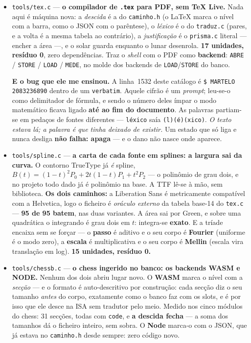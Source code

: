 \documentclass[11pt]{article}
\newcommand{\code}[1]{\texttt{\small #1}}
\theoremstyle{plain}
\theoremstyle{remark}
\begin{document}
\begin{itemize}
\item \code{tools/tex.c} --- \textbf{o compilador de \code{.tex} para PDF, sem TeX Live.} Nada
aqui é máquina nova: a \emph{descida} é a do \code{caminho.h} (o LaTeX marca o nível com a barra,
como o JSON com o parêntese), o \emph{léxico} é o do \code{traduz.c} (pares, e a volta é a mesma
tabela ao contrário), a \emph{justificação} é o \code{prisma.c} literal --- encher a área ---, e o
solar guarda enquanto o lunar desenrola. \textbf{17 unidades, resíduo 0}, zero dependências. Traz
o \emph{shell} com o PDF como \textbf{backend}: \code{ABRE} / \code{STORE} / \code{LOAD} /
\code{MEDE}, no molde dos backends de \code{LOAD}/\code{STORE} do banco.

\textbf{E o bug que ele me ensinou.} A linha~1532 deste catálogo é \code{\$ MARTELO 2083236890}
dentro de um \code{verbatim}. Aquele cifrão é um \emph{prompt}; leu-se-o como delimitador de
fórmula, e sendo o número deles ímpar o modo matemático ficava ligado \textbf{até ao fim do
documento}. As palavras partiam-se em pedaços de fontes diferentes --- \code{léxico} saía
\code{(l)(é)(xico)}. \emph{O texto estava lá; a palavra é que tinha deixado de existir.} Um estado
que só liga e nunca desliga \textbf{não falha: apaga} --- e o dano não nasce onde aparece.

\item \code{tools/spline.c} --- \textbf{a carta de cada fonte em splines: a largura sai da curva.}
O contorno TrueType já \emph{é} spline, $B(t)=(1-t)^2P_0+2t(1-t)P_1+t^2P_2$ --- o polinômio de grau
dois, e no projeto todo dado já é polinômio na base. A TTF lê-se à mão, sem biblioteca. \textbf{Os
dois caminhos:} a Liberation Sans é metricamente compatível com a Helvetica, logo o ficheiro é
\emph{oráculo externo} da tabela base-14 do \code{tex.c} --- \textbf{95 de 95 batem}, nas duas
variantes. A área sai por Green, e sobre uma quadrática o integrando é grau dois em $t$: integra-se
\textbf{exato}. E a tríade encaixa sem se forçar --- o \textbf{passo} é aditivo e o seu corpo é
\textbf{Fourier} (uniforme é o modo zero), a \textbf{escala} é multiplicativa e o seu corpo é
\textbf{Mellin} (escala vira translação em log). \textbf{15 unidades, resíduo 0.}


\item \code{tools/chessb.c} --- \textbf{o chess ingerido no banco: os backends WASM e NODE.}
Nenhum dos dois abriu lugar novo. O \textbf{WASM} marca o nível com a \emph{secção} --- e o formato
é auto-descritivo por construção: cada secção diz o seu tamanho \emph{antes} do corpo, exatamente
como o banco faz com os slots, e é por isso que ele desce na ISA sem tradutor pelo meio. Medido nos
cinco módulos do chess: 31 secções, todas com \code{code}, e \textbf{a descida fecha} --- a soma dos
tamanhos dá o ficheiro inteiro, sem sobra. O \textbf{Node} marca-o com o JSON, que já estava no
\code{caminho.h} desde sempre: zero código novo.


\end{itemize}
\end{document}

